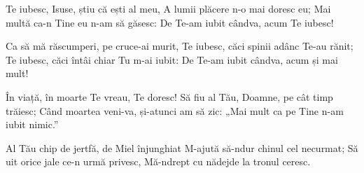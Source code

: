 \beginverse
Te iubesc, Isuse, știu că ești al meu,
A lumii plăcere n-o mai doresc eu;
Mai multă ca-n Tine eu n-am să găsesc:
De Te-am iubit cândva, acum Te iubesc!
\endverse

\beginverse
Ca să mă răscumperi, pe cruce-ai murit,
Te iubesc, căci spinii adânc Te-au rănit;
Te iubesc, căci întâi chiar Tu m-ai iubit:
De Te-am iubit cândva, acum și mai mult!
\endverse

\beginverse
În viață, în moarte Te vreau, Te doresc!
Să fiu al Tău, Doamne, pe cât timp trăiesc;
Când moartea veni-va, și-atunci am să zic:
„Mai mult ca pe Tine n-am iubit nimic.”
\endverse

\beginverse
Al Tău chip de jertfă, de Miel înjunghiat
M-ajută să-ndur chinul cel necurmat;
Să uit orice jale ce-n urmă privesc,
Mă-ndrept cu nădejde la tronul ceresc.
\endverse
\endsong